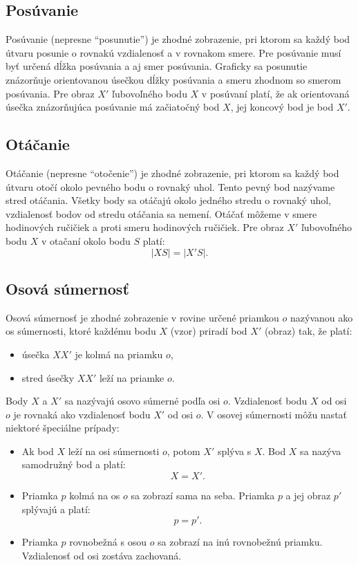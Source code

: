 \documentclass{article}
\begin{document}
\subsection{Posúvanie}

Posúvanie (nepresne \enquote{posunutie}) je zhodné zobrazenie, pri ktorom sa každý bod útvaru posunie o rovnakú vzdialenosť a v rovnakom smere. Pre posúvanie musí byť určená dĺžka posúvania a aj smer posúvania. Graficky sa posunutie znázorňuje orientovanou úsečkou dĺžky posúvania a smeru zhodnom so smerom posúvania. Pre obraz \(X'\) ľubovoľného bodu \(X\) v posúvaní platí, že ak orientovaná úsečka znázorňujúca posúvanie má začiatočný bod \(X\), jej koncový bod je bod \(X'\).

\subsection{Otáčanie}

Otáčanie (nepresne \enquote{otočenie}) je zhodné zobrazenie, pri ktorom sa každý bod útvaru otočí okolo pevného bodu o rovnaký uhol. Tento pevný bod nazývame stred otáčania. Všetky body sa otáčajú okolo jedného stredu o rovnaký uhol, vzdialenosť bodov od stredu otáčania sa nemení. Otáčať môžeme v smere hodinových ručičiek a proti smeru hodinových ručičiek. Pre obraz \(X'\) ľubovoľného bodu \(X\) v otačaní okolo bodu \(S\) platí:
\[
|XS| = |X'S|.
\]

\subsection{Osová súmernosť}

Osová súmernosť je zhodné zobrazenie v rovine určené priamkou \(o\) nazývanou ako os súmernosti, ktoré každému bodu \(X\) (vzor) priradí bod \(X'\) (obraz) tak, že platí:
\begin{itemize}
  \item úsečka \(XX'\) je kolmá na priamku \(o\),
  \item stred úsečky \(XX'\) leží na priamke \(o\).
\end{itemize}

Body \(X\) a \(X'\) sa nazývajú osovo súmerné podľa osi \(o\). Vzdialenosť bodu \(X\) od osi \(o\) je rovnaká ako vzdialenosť bodu \(X'\) od osi \(o\). V osovej súmernosti môžu nastať niektoré špeciálne prípady:
\begin{itemize}
  \item Ak bod \(X\) leží na osi súmernosti \(o\), potom \(X'\) splýva s \(X\). Bod \(X\) sa nazýva samodružný bod a platí:
  \[
  X = X'.
  \]
  \item Priamka \(p\) kolmá na os \(o\) sa zobrazí sama na seba. Priamka \(p\) a jej obraz \(p'\) splývajú a platí:
  \[
  p = p'.
  \]
  \item Priamka \(p\) rovnobežná s osou \(o\) sa zobrazí na inú rovnobežnú priamku. Vzdialenosť od osi zostáva zachovaná.
\end{itemize}
\end{document}
